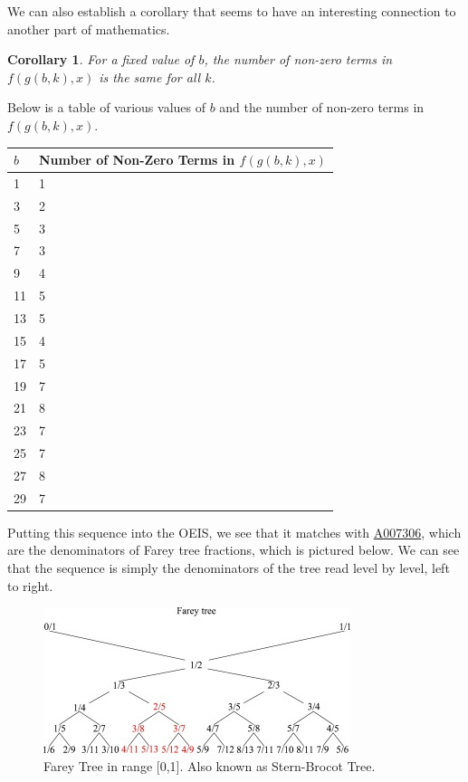 \documentclass{article}
\newtheorem{corollary}{Corollary}
\begin{document}
	We can also establish a corollary that seems to have an interesting connection to another part of mathematics.
	\begin{corollary}
		For a fixed value of $b$, the number of non-zero terms in $f(g(b,k),x)$ is the same for all $k$.
	\end{corollary}
	Below is a table of various values of $b$ and the number of non-zero terms in $f(g(b,k),x)$.
	
	\begin{table}[H]
		\centering
		\begin{tabular}{|l||l|}
			\hline
			$b$ & Number of Non-Zero Terms in $f(g(b,k),x)$ \\
			\hline\hline
			1 & 1 \\
			\hline
			3 & 2 \\
			\hline
			5 & 3 \\
			\hline
			7 & 3 \\
			\hline
			9 & 4 \\
			\hline
			11 & 5 \\
			\hline
			13 & 5 \\
			\hline
			15 & 4 \\
			\hline
			17 & 5 \\
			\hline
			19 & 7 \\
			\hline
			21 & 8 \\
			\hline
			23 & 7 \\
			\hline
			25 & 7 \\
			\hline
			27 & 8 \\
			\hline
			29 & 7 \\
			\hline
		\end{tabular}
	\end{table}
	
	Putting this sequence into the OEIS, we see that it matches with \href{https://oeis.org/A007306}{A007306}, which are the denominators of Farey tree fractions, which is pictured below.
	We can see that the sequence is simply the denominators of the tree read level by level, left to right.
	
	\begin{figure}[H]
		\centering
		\includegraphics[width=0.8\textwidth]{farey_tree.jpg}
		\caption{Farey Tree in range [0,1]. Also known as Stern-Brocot Tree.}
	\end{figure}
\end{document}
